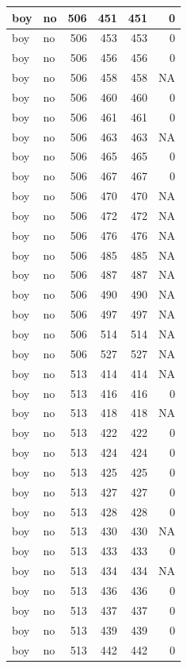 \documentclass[man]{apa6}
\begin{document}
\begin{tabular}{l|l|r|r|r|r}
\hline
boy & no & 506 & 451 & 451 & 0\\
\hline
boy & no & 506 & 453 & 453 & 0\\
\hline
boy & no & 506 & 456 & 456 & 0\\
\hline
boy & no & 506 & 458 & 458 & NA\\
\hline
boy & no & 506 & 460 & 460 & 0\\
\hline
boy & no & 506 & 461 & 461 & 0\\
\hline
boy & no & 506 & 463 & 463 & NA\\
\hline
boy & no & 506 & 465 & 465 & 0\\
\hline
boy & no & 506 & 467 & 467 & 0\\
\hline
boy & no & 506 & 470 & 470 & NA\\
\hline
boy & no & 506 & 472 & 472 & NA\\
\hline
boy & no & 506 & 476 & 476 & NA\\
\hline
boy & no & 506 & 485 & 485 & NA\\
\hline
boy & no & 506 & 487 & 487 & NA\\
\hline
boy & no & 506 & 490 & 490 & NA\\
\hline
boy & no & 506 & 497 & 497 & NA\\
\hline
boy & no & 506 & 514 & 514 & NA\\
\hline
boy & no & 506 & 527 & 527 & NA\\
\hline
boy & no & 513 & 414 & 414 & NA\\
\hline
boy & no & 513 & 416 & 416 & 0\\
\hline
boy & no & 513 & 418 & 418 & NA\\
\hline
boy & no & 513 & 422 & 422 & 0\\
\hline
boy & no & 513 & 424 & 424 & 0\\
\hline
boy & no & 513 & 425 & 425 & 0\\
\hline
boy & no & 513 & 427 & 427 & 0\\
\hline
boy & no & 513 & 428 & 428 & 0\\
\hline
boy & no & 513 & 430 & 430 & NA\\
\hline
boy & no & 513 & 433 & 433 & 0\\
\hline
boy & no & 513 & 434 & 434 & NA\\
\hline
boy & no & 513 & 436 & 436 & 0\\
\hline
boy & no & 513 & 437 & 437 & 0\\
\hline
boy & no & 513 & 439 & 439 & 0\\
\hline
boy & no & 513 & 442 & 442 & 0\\

\end{tabular}
\end{document}
